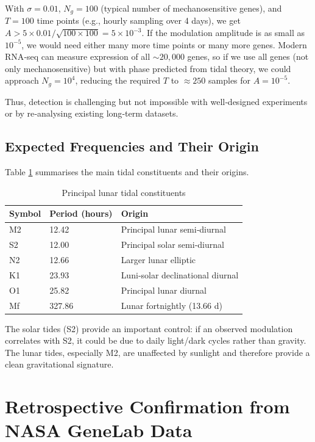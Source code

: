\documentclass[12pt,a4paper]{article}
\theoremstyle{remark}
\begin{document}
	With \(\sigma = 0.01\), \(N_g = 100\) (typical number of mechanosensitive genes), and \(T = 100\) time points (e.g., hourly sampling over 4 days), we get \(A > 5\times 0.01 / \sqrt{100\times 100} = 5\times 10^{-3}\). If the modulation amplitude is as small as \(10^{-5}\), we would need either many more time points or many more genes. Modern RNA‑seq can measure expression of all \(\sim 20,000\) genes, so if we use all genes (not only mechanosensitive) but with phase predicted from tidal theory, we could approach \(N_g = 10^4\), reducing the required \(T\) to \(\approx 250\) samples for \(A = 10^{-5}\).
	
	Thus, detection is challenging but not impossible with well‑designed experiments or by re‑analysing existing long‑term datasets.
	
	\subsection{Expected Frequencies and Their Origin}
	
	Table \ref{tab:tides} summarises the main tidal constituents and their origins.
	
	\begin{table}[htbp]
		\centering
		\caption{Principal lunar tidal constituents}
		\label{tab:tides}
		\small
		\begin{tabular}{lll}
			\toprule
			Symbol & Period (hours) & Origin \\
			\midrule
			M2 & 12.42 & Principal lunar semi‑diurnal \\
			S2 & 12.00 & Principal solar semi‑diurnal \\
			N2 & 12.66 & Larger lunar elliptic \\
			K1 & 23.93 & Luni‑solar declinational diurnal \\
			O1 & 25.82 & Principal lunar diurnal \\
			Mf & 327.86 & Lunar fortnightly (13.66 d) \\
			\bottomrule
		\end{tabular}
	\end{table}
	
	The solar tides (S2) provide an important control: if an observed modulation correlates with S2, it could be due to daily light/dark cycles rather than gravity. The lunar tides, especially M2, are unaffected by sunlight and therefore provide a clean gravitational signature.
	
	\section{Retrospective Confirmation from NASA GeneLab Data}
	\label{sec:genelab}
	
\end{document}
